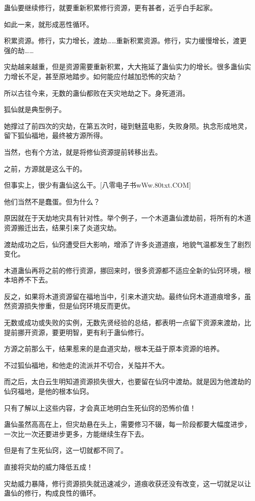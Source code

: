 \begin{this_body}
蛊仙要继续修行，就要重新积累修行资源，更有甚者，近乎白手起家。

如此一来，就形成恶性循环。

积累资源。修行，实力增长，渡劫……重新积累资源。修行，实力缓慢增长，渡更强的劫……

灾劫越来越重，但是资源需要重新积累，大大拖延了蛊仙实力的增长。很多蛊仙实力增长不足，甚至原地踏步。如何能应付越加恐怖的灾劫？

所以古往今来，无数的蛊仙都败在天灾地劫之下。身死道消。

狐仙就是典型例子。

她撑过了前四次的灾劫，在第五次时，碰到魅蓝电影，失败身陨。执念形成地灵，留下狐仙福地，最终被方源所得。

当然，也有个方法，就是将修仙资源提前转移出去。

之前，方源就是这么干的。

但事实上，很少有蛊仙这么干。[八零电子书wWw.80txt.COM]

他们当然不是蠢蛋。但为什么？

原因就在于天劫地灾具有针对性。举个例子，一个木道蛊仙渡劫前，将所有的木道资源搬迁出去，结果引来了炎道灾劫。

渡劫成功之后，仙窍遭受巨大影响，增添了许多炎道道痕，地貌气温都发生了剧烈变化。

木道蛊仙再将之前的修行资源，挪回来时，很多资源都不适应全新的仙窍环境，根本培养不下去。

反之，如果将木道资源留在福地当中，引来木道灾劫。最终仙窍木道道痕增多，虽然资源损失惨重，但是仙窍环境反而更优。

无数或成功或失败的实例，无数先贤经验的总结，都表明一点留下资源来渡劫，比提前挪开资源，要更明智，更有利于蛊仙修行。

方源之前那么干，结果惹来的是血道灾劫，根本无益于原本资源的培养。

不过狐仙福地，和他走的流派并不切合，关隘并不大。

而之后，太白云生明知道资源损失很大，也要留在仙窍中渡劫。就是因为他渡劫的仙窍福地，是他的根本仙窍。

只有了解以上这些内容，才会真正地明白生死仙窍的恐怖价值！

蛊仙虽然高高在上，但灾劫悬在头上，需要修习不辍，每一阶段都要大幅度进步，一次比一次还要进步更多，方能继续生存下去。

但是有了生死仙窍，这一切就都不同了。

直接将灾劫的威力降低五成！

灾劫威力暴降，修行资源损失就迅速减少，道痕收获还没有改变，这一切就足以让蛊仙的修行，构成良性的循环。


\end{this_body}
